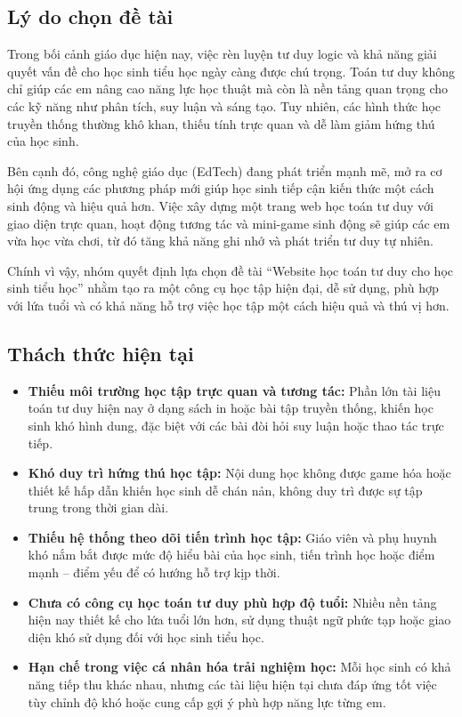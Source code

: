 \subsection{Lý do chọn đề tài}

Trong bối cảnh giáo dục hiện nay, việc rèn luyện tư duy logic và khả năng giải quyết vấn đề cho học sinh tiểu học ngày càng được chú trọng. Toán tư duy không chỉ giúp các em nâng cao năng lực học thuật mà còn là nền tảng quan trọng cho các kỹ năng như phân tích, suy luận và sáng tạo. Tuy nhiên, các hình thức học truyền thống thường khô khan, thiếu tính trực quan và dễ làm giảm hứng thú của học sinh.

Bên cạnh đó, công nghệ giáo dục (EdTech) đang phát triển mạnh mẽ, mở ra cơ hội ứng dụng các phương pháp mới giúp học sinh tiếp cận kiến thức một cách sinh động và hiệu quả hơn. Việc xây dựng một trang web học toán tư duy với giao diện trực quan, hoạt động tương tác và mini-game sinh động sẽ giúp các em vừa học vừa chơi, từ đó tăng khả năng ghi nhớ và phát triển tư duy tự nhiên.

Chính vì vậy, nhóm quyết định lựa chọn đề tài “Website học toán tư duy cho học sinh tiểu học” nhằm tạo ra một công cụ học tập hiện đại, dễ sử dụng, phù hợp với lứa tuổi và có khả năng hỗ trợ việc học tập một cách hiệu quả và thú vị hơn.

\subsection{Thách thức hiện tại}

\begin{itemize}
\item \textbf{Thiếu môi trường học tập trực quan và tương tác:} Phần lớn tài liệu toán tư duy hiện nay ở dạng sách in hoặc bài tập truyền thống, khiến học sinh khó hình dung, đặc biệt với các bài đòi hỏi suy luận hoặc thao tác trực tiếp.
\item \textbf{Khó duy trì hứng thú học tập:} Nội dung học không được game hóa hoặc thiết kế hấp dẫn khiến học sinh dễ chán nản, không duy trì được sự tập trung trong thời gian dài.

\item \textbf{Thiếu hệ thống theo dõi tiến trình học tập:} Giáo viên và phụ huynh khó nắm bắt được mức độ hiểu bài của học sinh, tiến trình học hoặc điểm mạnh – điểm yếu để có hướng hỗ trợ kịp thời.

\item \textbf{Chưa có công cụ học toán tư duy phù hợp độ tuổi:} Nhiều nền tảng hiện nay thiết kế cho lứa tuổi lớn hơn, sử dụng thuật ngữ phức tạp hoặc giao diện khó sử dụng đối với học sinh tiểu học.

\item \textbf{Hạn chế trong việc cá nhân hóa trải nghiệm học:} Mỗi học sinh có khả năng tiếp thu khác nhau, nhưng các tài liệu hiện tại chưa đáp ứng tốt việc tùy chỉnh độ khó hoặc cung cấp gợi ý phù hợp năng lực từng em.
\end{itemize}

